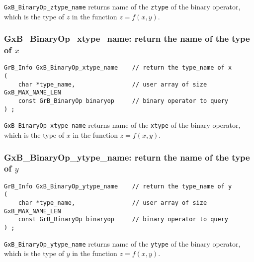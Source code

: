 \documentclass[12pt]{article}
\begin{document}
\verb'GxB_BinaryOp_ztype_name'
returns name of the \verb'ztype' of the binary operator, which is the
type of $z$ in the function $z=f(x,y)$.

\subsubsection{{\sf GxB\_BinaryOp\_xtype\_name:} return the name of the type of $x$}
\label{binaryop_xtype_name}

\begin{mdframed}[userdefinedwidth=6in]
{\footnotesize
\begin{verbatim}
GrB_Info GxB_BinaryOp_xtype_name    // return the type_name of x
(
    char *type_name,                // user array of size GxB_MAX_NAME_LEN
    const GrB_BinaryOp binaryop     // binary operator to query
) ;
\end{verbatim}
}\end{mdframed}

\verb'GxB_BinaryOp_xtype_name'
returns name of the \verb'xtype' of the binary operator, which is the
type of $x$ in the function $z=f(x,y)$.

\subsubsection{{\sf GxB\_BinaryOp\_ytype\_name:} return the name of the type of $y$}
\label{binaryop_ytype_name}

\begin{mdframed}[userdefinedwidth=6in]
{\footnotesize
\begin{verbatim}
GrB_Info GxB_BinaryOp_ytype_name    // return the type_name of y
(
    char *type_name,                // user array of size GxB_MAX_NAME_LEN
    const GrB_BinaryOp binaryop     // binary operator to query
) ;
\end{verbatim}
} \end{mdframed}

\verb'GxB_BinaryOp_ytype_name'
returns name of the \verb'ytype' of the binary operator, which is the
type of $y$ in the function $z=f(x,y)$.

\end{document}
